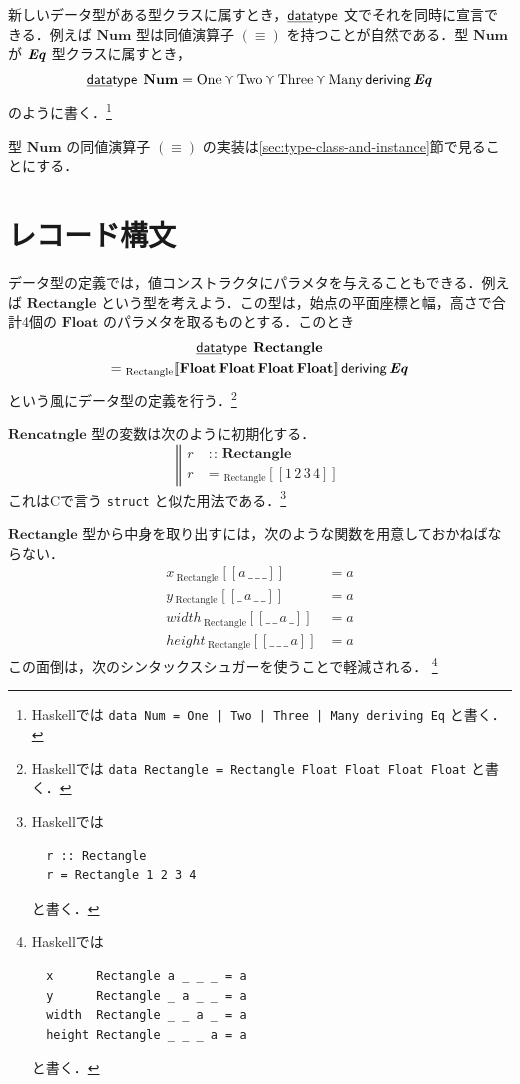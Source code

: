 \documentclass[a5paper,twoside,fleqn,draft]{jsbook}
\def\[{[\![}
\def\]{]\!]}
\newcommand{\programminglanguage}[1]{\textsf{#1}}
\newcommand{\clang}{\programminglanguage{C}}
\newcommand{\haskell}{\programminglanguage{Haskell}}
\newcommand{\code}[1]{\texttt{#1}}
\newcommand{\mBrace}{\Vert}
\newcommand{\mKeyword}[1]{\mathsf{#1}}
\newcommand{\mKeywordUnderline}[1]{\text{\underline{\textsf{#1}}}}
\newcommand{\mDataTypeKeyword}{\mKeywordUnderline{data}\mKeyword{type}}
\newcommand{\mDerivingKeyword}{\mKeyword{deriving}}
\DeclareMathOperator{\mDataType}{\mDataTypeKeyword}
\DeclareMathOperator{\mDeriving}{\mDerivingKeyword}
\newcommand{\mSpecialConstant}[1]{\textrm{#1}}
\newcommand{\mNumOne}{\mSpecialConstant{One}}
\newcommand{\mNumTwo}{\mSpecialConstant{Two}}
\newcommand{\mNumThree}{\mSpecialConstant{Three}}
\newcommand{\mNumMany}{\mSpecialConstant{Many}}
\DeclareMathOperator{\mIn}{{:\!:}}
\DeclareMathOperator{\mValueOr}{\curlyvee}
\newcommand{\mType}[1]{\mathbf{#1}} %
\newcommand{\mFloatType}{\mType{Float}}
\newcommand{\mValueConstructor}[1]{\mathrm{#1}}
\newcommand{\mValueWith}[2]{{}_\mValueConstructor{#1}\[#2\]}
\newcommand{\mTypeClass}[1]{\textbf{\textit{#1}}}
\newcommand{\mEqTypeClass}{\mTypeClass{Eq}}
\begin{document}
新しいデータ型がある型クラスに属すとき，$\mDataType$ 文でそれを同時に宣言できる．例えば $\mType{Num}$ 型は同値演算子 $(\equiv)$ を持つことが自然である．型 $\mType{Num}$ が $\mEqTypeClass$ 型クラスに属すとき，
\begin{equation}
  \mDataType\;
  \mType{Num}
  =\mNumOne\mValueOr\mNumTwo\mValueOr\mNumThree\mValueOr\mNumMany
  \mDeriving\mEqTypeClass
\end{equation}
のように書く．\footnote{\haskell では \code{data Num = One | Two | Three | Many deriving Eq} と書く．}

型 $\mType{Num}$ の同値演算子 $(\equiv)$ の実装は\ref{sec:type-class-and-instance}節で見ることにする．

\section{レコード構文}

データ型の定義では，値コンストラクタにパラメタを与えることもできる．例えば $\mType{Rectangle}$ という型を考えよう．この型は，始点の平面座標と幅，高さで合計4個の $\mFloatType$ のパラメタを取るものとする．このとき
\begin{multline}
  \label{eq:rectangle}
  \mDataType\;
  \mType{Rectangle}\\
  =\mValueWith{Rectangle}
  {\mFloatType\,\mFloatType\,\mFloatType\,\mFloatType}
  \mDeriving\mEqTypeClass
\end{multline}
という風にデータ型の定義を行う．\footnote{\haskell では \code{data Rectangle = Rectangle Float Float Float Float} と書く．}

$\mType{Rencatngle}$ 型の変数は次のように初期化する．
\begin{equation}
  \left\mBrace
  \begin{aligned}
    r&\mIn\mType{Rectangle}\\
    r&=\mValueWith{Rectangle}{1\,2\,3\,4}
  \end{aligned}
  \right.
\end{equation}
これは\clang で言う \code{struct} と似た用法である．\footnote{\haskell では
\begin{verbatim}
  r :: Rectangle
  r = Rectangle 1 2 3 4
\end{verbatim}
と書く．}

$\mType{Rectangle}$ 型から中身を取り出すには，次のような関数を用意しておかねばならない．
\begin{align}
  x\,\mValueWith{Rectangle}{a\,\_\,\_\,\_}
  &=a\\
  y\,\mValueWith{Rectangle}{\_\,a\,\_\,\_}
  &=a\\
  width\,\mValueWith{Rectangle}{\_\,\_\,a\,\_}
  &=a\\
  height\,\mValueWith{Rectangle}{\_\,\_\,\_\,a}
  &=a
\end{align}
この面倒は，次のシンタックスシュガーを使うことで軽減される．
\footnote{\haskell では
\begin{verbatim}
  x      Rectangle a _ _ _ = a
  y      Rectangle _ a _ _ = a
  width  Rectangle _ _ a _ = a
  height Rectangle _ _ _ a = a
\end{verbatim}
と書く．}
\end{document}
